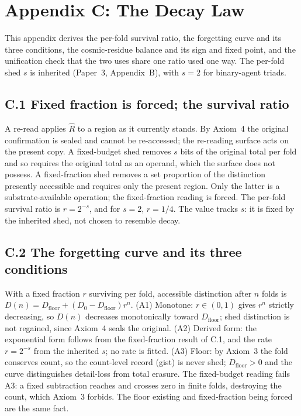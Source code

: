\documentclass[11pt,oneside]{report}
\theoremstyle{definition}
\theoremstyle{remark}
\begin{document}
\section*{Appendix C: The Decay Law}

This appendix derives the per-fold survival ratio, the forgetting curve
and its three conditions, the cosmic-residue balance and its sign and
fixed point, and the unification check that the two uses share one ratio
used one way. The per-fold shed \ensuremath{s} is inherited (Paper~3,
Appendix~B), with \ensuremath{s = 2} for binary-agent triads.

\subsection*{C.1 Fixed fraction is forced; the survival ratio}

A re-read applies \ensuremath{\hat{R}} to a region as it currently stands.
By Axiom~4 the original confirmation is sealed and cannot be re-accessed;
the re-reading surface acts on the present copy. A fixed-budget shed
removes \ensuremath{s} bits of the original total per fold and so requires
the original total as an operand, which the surface does not possess. A
fixed-fraction shed removes a set proportion of the distinction presently
accessible and requires only the present region. Only the latter is a
substrate-available operation; the fixed-fraction reading is forced. The
per-fold survival ratio is \ensuremath{r = 2^{-s}}, and for \ensuremath{s
= 2}, \ensuremath{r = 1/4}. The value tracks \ensuremath{s}: it is fixed
by the inherited shed, not chosen to resemble decay.

\subsection*{C.2 The forgetting curve and its three conditions}

With a fixed fraction \ensuremath{r} surviving per fold, accessible
distinction after \ensuremath{n} folds is
\ensuremath{D(n) = D_{\mathrm{floor}} + (D_{0} - D_{\mathrm{floor}}) r^{n}}.
(A1) Monotone: \ensuremath{r \in (0,1)} gives \ensuremath{r^{n}} strictly
decreasing, so \ensuremath{D(n)} decreases monotonically toward
\ensuremath{D_{\mathrm{floor}}}; shed distinction is not regained, since
Axiom~4 seals the original. (A2) Derived form: the exponential form
follows from the fixed-fraction result of C.1, and the rate
\ensuremath{r = 2^{-s}} from the inherited \ensuremath{s}; no rate is
fitted. (A3) Floor: by Axiom~3 the fold conserves count, so the count-level
record (gist) is never shed; \ensuremath{D_{\mathrm{floor}} > 0} and the
curve distinguishes detail-loss from total erasure. The fixed-budget
reading fails A3: a fixed subtraction reaches and crosses zero in finite
folds, destroying the count, which Axiom~3 forbids. The floor existing and
fixed-fraction being forced are the same fact.
\end{document}
